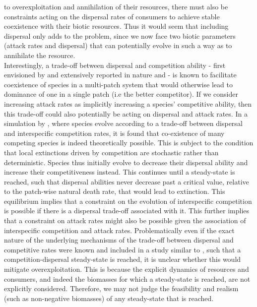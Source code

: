 \documentclass[a4paper]{report}
\begin{document}
to overexploitation and annihilation of their resources, there must also be constraints acting on the dispersal rates of consumers to achieve stable coexistence with their biotic resources. Thus it would seem that including dispersal only adds to the problem, since we now face two biotic parameters (attack rates and dispersal) that can potentially evolve in such a way as to annihilate the resource.\\

Interestingly, a trade-off between dispersal and competition ability - first envisioned by \citep{levins1971} and extensively reported in nature \citep{yawata2014} and \citep{William2006} - is known to facilitate coexistence of species in a multi-patch system that would otherwise lead to dominance of one in a single patch (i.e the better competitor). If we consider increasing attack rates as implicitly increasing a species’ competitive ability, then this trade-off could also potentially be acting on dispersal and attack rates. In a simulation by \citep{Pillai2012}, where species evolve according to a trade-off between dispersal and interspecific competition rates, it is found that co-existence of many competing species is indeed theoretically possible. This is subject to the condition that local extinctions driven by competition are stochastic rather than deterministic. Species thus initially evolve to decrease their dispersal ability and increase their competitiveness instead. This continues until a steady-state is reached, such that dispersal abilities never decrease past a critical value, relative to the patch-wise natural death rate, that would lead to extinction. This equilibrium implies that a constraint on the evolution of interspecific competition is possible if there is a dispersal trade-off associated with it. This further implies that a constraint on attack rates might also be possible given the association of interspecific competition and attack rates. Problematically even if the exact nature of the underlying mechanisms of the trade-off between dispersal and competitive rates were known and included in a study similar to \citep{Pillai2012}, such that a competition-dispersal steady-state is reached, it is unclear whether this would mitigate overexploitation. This is because the explicit dynamics of resources and consumers, and indeed the biomasses for which a steady-state is reached, are not explicitly considered. Therefore, we may not judge the feasibility and realism (such as non-negative biomasses) of any steady-state that is reached.\\
\end{document}
